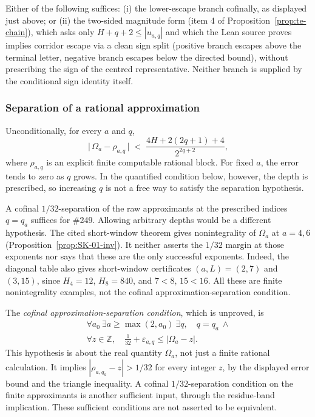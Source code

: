\begin{prop}\label{prop:sufficient-extension}
Either of the following suffices: (i) the lower-escape branch cofinally, as displayed just above; or (ii) the two-sided
magnitude form
(item 4 of Proposition~\ref{prop:te-chain}), which asks only $H{+}q{+}2 \le
|u_{a,q}|$ and which the Lean source proves
implies corridor escape via a clean sign split (positive branch escapes above the terminal letter,
negative branch escapes below the directed bound), without prescribing the sign of the centred representative. Neither
branch is supplied by the conditional sign identity itself.
\end{prop}

\subsubsection{Separation of a rational approximation}

\begin{thm}\label{thm:separation-rational-approximation}
Unconditionally, for every $a$ and $q$,
\[
  \bigl|\, \Omega_a - \rho_{a,q} \,\bigr|
  \;<\; \frac{4H + 2(2q{+}1) + 4}{2^{2q+2}} ,
\]
where $\rho_{a,q}$ is an explicit finite computable rational block. For fixed $a$, the error tends to zero as $q$ grows. In the quantified
condition below, however, the depth is prescribed, so increasing $q$
is not a free way to satisfy the separation hypothesis.
\end{thm}

\begin{rem}
A cofinal $1/32$-separation of the raw approximants at the prescribed
indices $q=q_a$ suffices for \#249. Allowing arbitrary depths would be a
different hypothesis. The cited short-window theorem gives
nonintegrality of $\Omega_a$ at $a=4,6$
(Proposition~\ref{prop:SK-01-inv}).
It neither asserts the $1/32$ margin at those exponents nor says that
these are the only successful exponents. Indeed, the diagonal table also
gives short-window certificates $(a,L)=(2,7)$ and $(3,15)$, since
$H_4=12$, $H_8=840$, and $7<8$, $15<16$. All these are finite
nonintegrality examples, not the cofinal approximation-separation condition.
\end{rem}

\begin{defn}
The \emph{cofinal approximation-separation condition}, which is unproved, is
\[
 \begin{gathered}
  \forall a_0\ \exists a\ge\max(2,a_0)\ \exists q,\quad q=q_a\ \wedge\\
  \forall z\in\mathbb Z,\quad \tfrac1{32}+\varepsilon_{a,q}
       \le |\Omega_a-z| .
 \end{gathered}
\]
This hypothesis is about the real quantity $\Omega_a$, not just a finite
rational calculation. It implies
$|\rho_{a,q_a}-z|>1/32$ for every integer $z$, by the displayed error
bound and the triangle inequality. A cofinal $1/32$-separation condition
on the finite approximants is another sufficient input, through the
residue-band implication. These sufficient conditions are not asserted
to be equivalent.
\end{defn}

